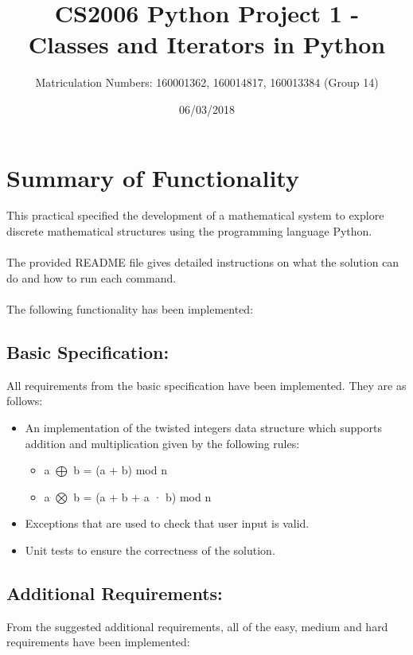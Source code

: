 \documentclass[11]{article}
\title{CS2006 Python Project 1 - \\Classes and Iterators in Python}
\date{06/03/2018}
\author{Matriculation Numbers: 160001362, 160014817, 160013384 (Group 14)}
\begin{document}
	\maketitle
	\newpage
	\tableofcontents
	
	\newpage
	\section{Summary of Functionality}
		This practical specified the development of a mathematical system to explore discrete mathematical structures using the programming language Python. \\\\
The provided README file gives detailed instructions on what the solution can do and how to run each command. \\\\
The following functionality has been implemented:
	\subsection{Basic Specification:}
		All requirements from the basic specification have been implemented. They are as follows:	
		\begin{itemize}
			\item An implementation of the twisted integers data structure which supports addition and multiplication given by the following rules:
				\begin{itemize}
				\item a $\bigoplus$ b = (a + b) mod n 
				\item a $\bigotimes$ b = (a + b + a · b) mod n
				\end{itemize}
			\item Exceptions that are used to check that user input is valid.
			\item Unit tests to ensure the correctness of the solution.
		\end{itemize}
	
	\subsection{Additional Requirements:}
	 From the suggested additional requirements, all of the easy, medium and hard requirements have been implemented:
\end{document}
